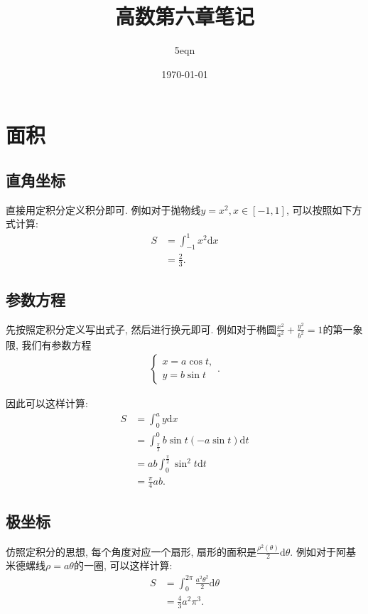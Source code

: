 \documentclass[UTF8,a4paper,11pt]{ctexart}
\title{高数第六章笔记}
\author{5eqn}
\date{\today}
\begin{document}
  \maketitle
  \section{面积}
    \subsection{直角坐标}
      直接用定积分定义积分即可.
      例如对于抛物线$y=x^{2}, x \in [-1,1]$,
      可以按照如下方式计算:
      \[
      \begin{aligned}
        S&=\int_{-1}^{1}x^{2}\mathrm{d}x
        \\&=\frac{2}{3}
      .\end{aligned}
      \]
    \subsection{参数方程}
      先按照定积分定义写出式子,
      然后进行换元即可.
      例如对于椭圆$\frac{x^{2}}{a^{2}}+\frac{y^{2}}{b^{2}}=1$的第一象限,
      我们有参数方程
      \[
      \begin{aligned}
        \begin{cases}
          x=a \cos t ,\\
          y=b \sin t
        \end{cases}
      .\end{aligned}
      \]
      
      因此可以这样计算:
      \[
      \begin{aligned}
        S&=\int_{0}^{a}y\mathrm{d}x
        \\&=\int_{\frac{\pi}{2}}^{0}b\sin t \left(-a \sin t\right) \mathrm{d}t
        \\&=ab\int_{0}^{\frac{\pi}{2}}\sin ^{2}t \mathrm{d}t
        \\&=\frac{\pi}{4}ab
      .\end{aligned}
      \]
    \subsection{极坐标}
      仿照定积分的思想,
      每个角度对应一个扇形,
      扇形的面积是$\frac{\rho^{2}\left(\theta\right)}{2}\mathrm{d}\theta$.
      例如对于阿基米德螺线$\rho=a\theta$的一圈,
      可以这样计算:
      \[
      \begin{aligned}
        S&=\int_{0}^{2\pi}\frac{a^{2}\theta^{2}}{2}\mathrm{d}\theta 
        \\&=\frac{4}{3}a^{2}\pi^{3}
      .\end{aligned}
      \]
\end{document}

